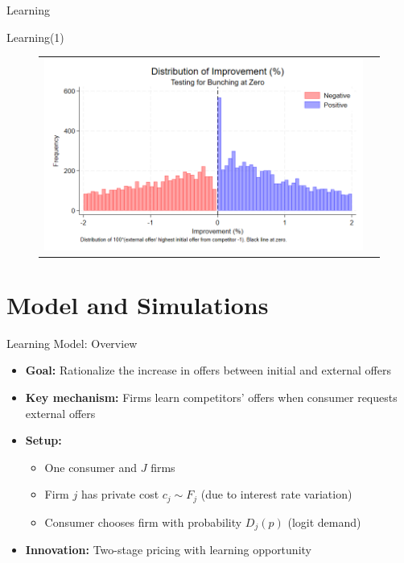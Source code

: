 \documentclass[10pt,aspectratio=169]{beamer}
\begin{document}
\begin{frame}{Learning}\label{slide:fig4}    
\scalebox{0.8}{
    
}
\hyperlink{slide:Descriptive_evidence}{}
\end{frame}


\begin{frame}{Learning(1)}\label{slide:fig5}
  \begin{figure}[H]
\centering{}%
\begin{tabular}{cc}
\includegraphics[scale=0.39]{../figures/IE7/IE7_hist_bunching_max(2).png} 
\end{tabular}
\end{figure}
\hyperlink{slide:Descriptive_evidence}{}
\end{frame}


\section{Model and Simulations}


\begin{frame}{Learning Model: Overview}
\begin{itemize}
    \item \textbf{Goal:} Rationalize the increase in offers between initial and external offers
    
    \item \textbf{Key mechanism:} Firms learn competitors' offers when consumer requests external offers
    
    \item \textbf{Setup:}
    \begin{itemize}
        \item One consumer and $J$ firms
        \item Firm $j$ has private cost $c_j \sim F_j$ (due to interest rate variation)
        \item Consumer chooses firm with probability $D_j(p)$ (logit demand)
    \end{itemize}
    
    \item \textbf{Innovation:} Two-stage pricing with learning opportunity
\end{itemize}
\end{frame}
\end{document}
